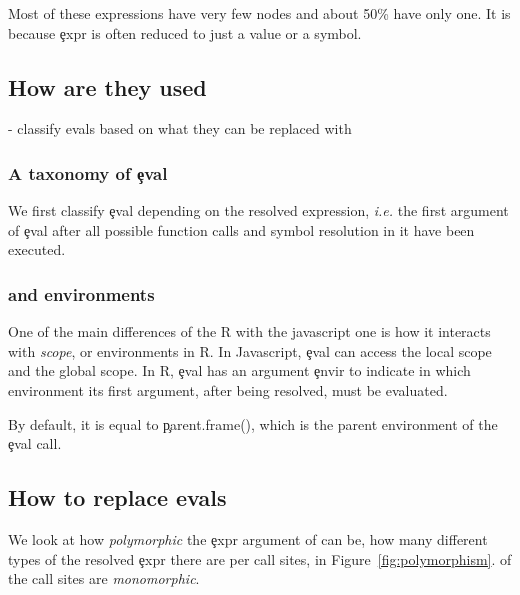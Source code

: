 \documentclass[conference]{IEEEtran}
\begin{document}
Most of these expressions have very few nodes and about 50\% have only one. It is because \c{expr} is often reduced to just a value or a symbol.


\subsection{How are they used}

- classify evals based on what they can be replaced with

\subsubsection{A taxonomy of \c{eval}}

We first classify \c{eval} depending on the resolved expression, \emph{i.e.}
the first argument of \c{eval} after all possible function calls and symbol
resolution in it have been executed.


\subsubsection{\eval and environments}

One of the main differences of the R \eval with the javascript one is how it interacts with \emph{scope}, or environments in R. In Javascript, \c{eval} can access the local scope and the global scope. In R, \c{eval} has an argument \c{envir} to indicate in which environment its first argument, after being resolved, must be evaluated.

By default, it is equal to \c{parent.frame()}, which is the parent environment of the \c{eval} call.

\subsection{How to replace evals}

We look at how \emph{polymorphic} the \c{expr} argument of \eval can be, \ie how many different types of the resolved \c{expr} there are per call sites, in Figure~\ref{fig:polymorphism}. \DegreeMonomorphism of the call sites are \emph{monomorphic}.
\end{document}
